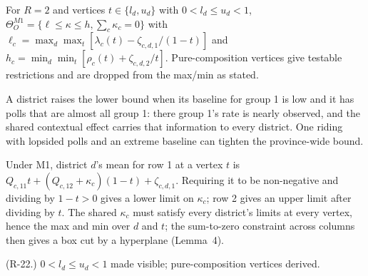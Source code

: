 \begin{result}\label{res:d3}
 For $R=2$ and vertices $t\in\{l_d,u_d\}$ with $0<l_d\le u_d<1$,
$\Theta^{M1}_O=\{\ell\le\kappa\le h,\sum_c\kappa_c=0\}$ with
$\ell_c=\max_d\max_t[\lambda_c(t)-\zeta_{c,d,1}/(1-t)]$ and
$h_c=\min_d\min_t[\rho_c(t)+\zeta_{c,d,2}/t]$. Pure-composition vertices give
testable restrictions and are dropped from the max/min as stated.
\end{result}
\begin{plain}
A district raises the lower bound when its baseline for group 1 is low and it has
polls that are almost all group 1: there group 1's rate is nearly observed, and
the shared contextual effect carries that information to every district. One
riding with lopsided polls and an extreme baseline can tighten the province-wide
bound.
\end{plain}
\begin{sketch}
Under M1, district $d$'s mean for row 1 at a vertex $t$ is $Q_{c,11}t+(Q_{c,12}+\kappa_c)(1-t)+\zeta_{c,d,1}$.
Requiring it to be non-negative and dividing by $1-t>0$ gives a lower limit on
$\kappa_c$; row 2 gives an upper limit after dividing by $t$. The shared
$\kappa_c$ must satisfy every district's limits at every vertex, hence the max and
min over $d$ and $t$; the sum-to-zero constraint across columns then gives a box
cut by a hyperplane (Lemma~4).
\end{sketch}
\begin{revnote}(R-22.) $0<l_d\le u_d<1$ made visible; pure-composition vertices derived.\end{revnote}

